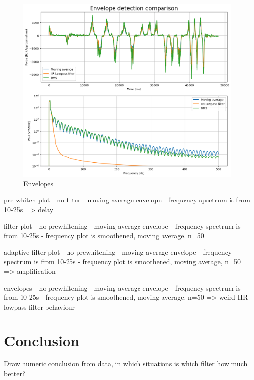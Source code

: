 \begin{figure}[h!t]
	\begin{center}
		\includegraphics[width=0.8\columnwidth]{images/measurement_envelopes.png}
	\end{center}
	\caption{Envelopes}
	\label{fig:result_envelopes}
\end{figure}

pre-whiten plot
- no filter
- moving average envelope
- frequency spectrum is from 10-25s
=> delay

filter plot
- no prewhitening
- moving average envelope
- frequency spectrum is from 10-25s
- frequency plot is smoothened, moving average, n=50

adaptive filter plot
- no prewhitening
- moving average envelope
- frequency spectrum is from 10-25s
- frequency plot is smoothened, moving average, n=50
=> amplification 

envelopes
- no prewhitening
- moving average envelope
- frequency spectrum is from 10-25s
- frequency plot is smoothened, moving average, n=50
=> weird IIR lowpass filter behaviour


\section{Conclusion}
Draw numeric conclusion from data, in which situations is which filter how much better?